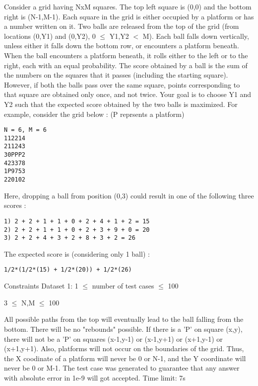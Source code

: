 Consider a grid having NxM squares. The top left square is (0,0) and the bottom right is (N-1,M-1). Each square in the grid is either occupied by a platform or has a number written on it. Two balls are released from the top of the grid (from locations (0,Y1) and (0,Y2), 0  $\le$  Y1,Y2 $<$ M). Each ball falls down vertically, unless either it falls down the bottom row, or encounters a platform beneath. When the ball encounters a platform beneath, it rolls either to the left or to the right, each with an equal probability. The score obtained by a ball is the sum of the numbers on the squares that it passes (including the starting square). However, if both the balls pass over the same square, points corresponding to that square are obtained only once, and not twice. Your goal is to choose Y1 and Y2 such that the expected score obtained by the two balls is maximized. For example, consider the grid below : (P reprsents a platform)  
\begin{verbatim}
N = 6, M = 6
112214
211243
30PPP2
423378
1P9753
220102
\end{verbatim}

   Here, dropping a ball from position (0,3) could result in one of the following three scores :  
\begin{verbatim}
1) 2 + 2 + 1 + 1 + 0 + 2 + 4 + 1 + 2 = 15 
2) 2 + 2 + 1 + 1 + 0 + 2 + 3 + 9 + 0 = 20
3) 2 + 2 + 4 + 3 + 2 + 8 + 3 + 2 = 26
\end{verbatim}

   The expected score is (considering only 1 ball) :  
\begin{verbatim}
1/2*(1/2*(15) + 1/2*(20)) + 1/2*(26)\end{verbatim}
Constraints
Dataset 1: 1  $\le$  number of test cases  $\le$  100  

   3  $\le$  N,M  $\le$  100  

   All possible paths from the top will eventually lead to the ball falling from the bottom. There will be no "rebounds" possible. If there is a 'P' on square (x,y), there will not be a 'P' on squares (x-1,y-1) or (x-1,y+1) or (x+1,y-1) or (x+1,y+1). Also, platforms will not occur on the boundaries of the grid. Thus, the X coodinate of a platform will never be 0 or N-1, and the Y coordinate will never be 0 or M-1. The test case was generated to guarantee that any answer with absolute error in 1e-9 will got accepted. Time limit: 7s